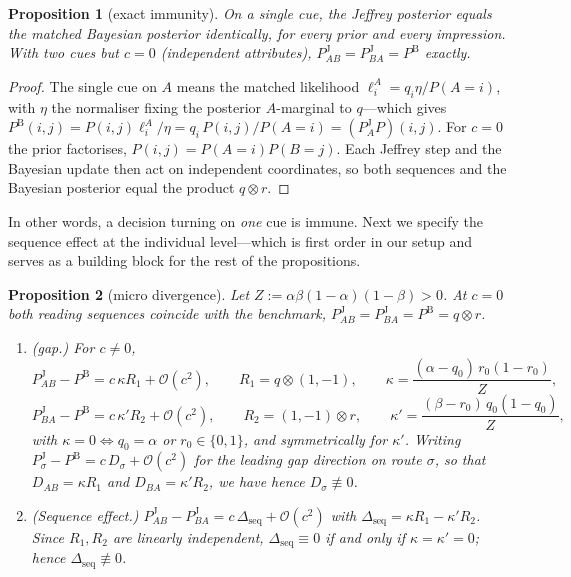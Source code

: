 \documentclass[a4paper,fleqn]{cas-sc}
\newtheorem{proposition}{Proposition}
\theoremstyle{remark}
\theoremstyle{definition}
\newcommand{\PB}{P^{\mathrm{B}}}
\newcommand{\PJ}{P^{\mathrm{J}}}
\newcommand{\bigO}{\mathcal{O}}
\newcommand{\anchor}[1]{}
\begin{document}
\renewcommand{\theproposition}{IMM}%
\begin{proposition}[exact immunity]\label{prop:IMM}
On a single cue, the Jeffrey posterior equals the matched Bayesian posterior identically, for
every prior and every impression. With two cues but $c=0$ (independent attributes),
$\PJ_{AB}=\PJ_{BA}=\PB$ exactly. \anchor{Prop.~IMM}
\end{proposition}

\begin{proof}
The single cue on $A$ means the matched likelihood $\ell^A_i=q_i \eta/P(A{=}i)$, with $\eta$ the normaliser fixing the posterior $A$-marginal to $q$---which gives $\PB(i,j)=P(i,j)\ell^A_i/\eta=q_i\,P(i,j)/P(A{=}i)=(\PJ_A P)(i,j)$. For $c=0$ the prior factorises, $P(i,j)=P(A{=}i)P(B{=}j)$. Each Jeffrey step and the Bayesian update then act on independent coordinates, so both sequences and the Bayesian posterior equal the product $q\otimes r$.
\end{proof}

In other words, a decision turning on \emph{one} cue is immune. Next we specify the sequence effect at the individual level---which is first order in our setup and serves as a building block for the rest of the propositions. 

\renewcommand{\theproposition}{DIV}%
\begin{proposition}[micro divergence]\label{prop:DIV}
Let $Z:=\alpha\beta(1-\alpha)(1-\beta)>0$. At $c=0$ both reading sequences coincide with the
benchmark, $\PJ_{AB}=\PJ_{BA}=\PB=q\otimes r$.
\begin{enumerate}
\item[(i)] \textup{(gap.)} For $c\neq0$,
\[
  \PJ_{AB}-\PB=c\,\kappa R_1+\bigO(c^{2}),
  \qquad
  R_1=q\otimes(1,-1),
  \qquad
  \kappa=\frac{(\alpha-q_0)\,r_0(1-r_0)}{Z},
\]
\[
  \PJ_{BA}-\PB=c\,\kappa' R_2+\bigO(c^{2}),
  \qquad
  R_2=(1,-1)\otimes r,
  \qquad
  \kappa'=\frac{(\beta-r_0)\,q_0(1-q_0)}{Z},
\]
with $\kappa=0\iff q_0=\alpha$ or $r_0\in\{0,1\}$, and symmetrically for $\kappa'$. Writing
$\PJ_\sigma-\PB=c\,D_\sigma+\bigO(c^{2})$ for the leading gap direction on route $\sigma$, so
that $D_{AB}=\kappa R_1$ and $D_{BA}=\kappa'R_2$, we have hence
$D_\sigma\not\equiv0$.
\item[(ii)] \textup{(Sequence effect.)} $\PJ_{AB}-\PJ_{BA}=c\,\Delta_{\mathrm{seq}}+\bigO(c^{2})$
with $\Delta_{\mathrm{seq}}=\kappa R_1-\kappa' R_2$. Since $R_1,R_2$ are linearly independent,
$\Delta_{\mathrm{seq}}\equiv0$ if and only if $\kappa=\kappa'=0$; hence
$\Delta_{\mathrm{seq}}\not\equiv0$.
\end{enumerate}
\anchor{Prop.~DIV}
\end{proposition}
\end{document}
